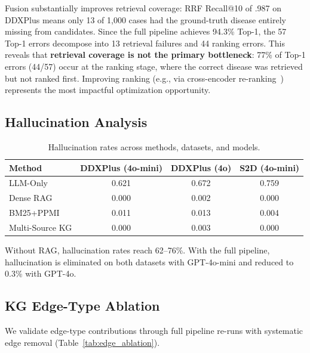 \documentclass[runningheads]{llncs}
\begin{document}
Fusion substantially improves retrieval coverage: RRF Recall@10 of .987 on DDXPlus means only 13 of 1,000 cases had the ground-truth disease entirely missing from candidates. Since the full pipeline achieves 94.3\% Top-1, the 57 Top-1 errors decompose into 13 retrieval failures and 44 ranking errors. This reveals that \textbf{retrieval coverage is not the primary bottleneck}: 77\% of Top-1 errors (44/57) occur at the ranking stage, where the correct disease was retrieved but not ranked first. Improving ranking (e.g., via cross-encoder re-ranking~\cite{nogueira2020passage}) represents the most impactful optimization opportunity.

\subsection{Hallucination Analysis}
\label{sec:hallucination}

\begin{table}[t]
\centering
\caption{Hallucination rates across methods, datasets, and models.}
\label{tab:halluc}
\begin{tabular}{lccc}
\toprule
\textbf{Method} & \textbf{DDXPlus (4o-mini)} & \textbf{DDXPlus (4o)} & \textbf{S2D (4o-mini)} \\
\midrule
LLM-Only        & 0.621 & 0.672 & 0.759 \\
Dense RAG        & 0.000 & 0.002 & 0.000 \\
BM25+PPMI        & 0.011 & 0.013 & 0.004 \\
Multi-Source KG  & 0.000 & 0.003 & 0.000 \\
\bottomrule
\end{tabular}
\end{table}

Without RAG, hallucination rates reach 62--76\%. With the full pipeline, hallucination is eliminated on both datasets with GPT-4o-mini and reduced to 0.3\% with GPT-4o.

\subsection{KG Edge-Type Ablation}
\label{sec:edge_ablation}

We validate edge-type contributions through full pipeline re-runs with systematic edge removal (Table~\ref{tab:edge_ablation}).
\end{document}
